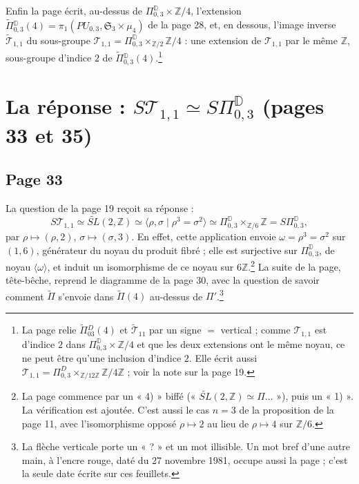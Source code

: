 \documentclass[11pt,a4paper]{article}
\begin{document}
Enfin la page écrit, au-dessus de $\Pi^{\mathbb{D}}_{0,3} \times \mathbb{Z}/4$,
l'extension $\widetilde{\Pi}{}^{\mathbb{D}}_{0,3}(4) = \pi_1(PU_{0,3},
\mathfrak{S}_3 \times \mu_4)$ de la page 28, et, en dessous, l'image inverse
$\widetilde{\mathcal{T}}_{1,1}$ du sous-groupe $\mathcal{T}_{1,1} =
\Pi^{\mathbb{D}}_{0,3} \times_{\mathbb{Z}/2} \mathbb{Z}/4$ : une extension de
$\mathcal{T}_{1,1}$ par le même $\mathbb{Z}$, sous-groupe d'indice $2$ de
$\widetilde{\Pi}{}^{\mathbb{D}}_{0,3}(4)$.\footnote{La page relie
$\widetilde{\Pi}{}^{D}_{03}(4)$ et $\widetilde{\mathcal{T}}_{11}$ par un signe $=$
vertical ; comme $\mathcal{T}_{1,1}$ est d'indice $2$ dans $\Pi^{\mathbb{D}}_{0,3}
\times \mathbb{Z}/4$ et que les deux extensions ont le même noyau, ce ne peut être
qu'une inclusion d'indice $2$. Elle écrit aussi
$\mathcal{T}_{1,1} = \Pi^{D}_{0,3} \times_{\mathbb{Z}/12\mathbb{Z}}
\mathbb{Z}/4\mathbb{Z}$ ; voir la note sur la page 19.}

\section*{La réponse : $S\mathcal{T}_{1,1} \simeq S\Pi^{\mathbb{D}}_{0,3}$ (pages 33 et 35)}

\subsection*{Page 33}

La question de la page 19 reçoit sa réponse :
\[
S\mathcal{T}_{1,1} \simeq \widetilde{SL}(2, \mathbb{Z})
\simeq \langle \rho, \sigma \mid \rho^3 = \sigma^2 \rangle
\simeq \Pi^{\mathbb{D}}_{0,3} \times_{\mathbb{Z}/6} \mathbb{Z}
= S\Pi^{\mathbb{D}}_{0,3} ,
\]
par $\rho \mapsto (\rho, 2)$, $\sigma \mapsto (\sigma, 3)$. En effet, cette
application envoie $\omega = \rho^3 = \sigma^2$ sur $(1, 6)$, générateur du noyau
du produit fibré ; elle est surjective sur $\Pi^{\mathbb{D}}_{0,3}$, de noyau
$\langle \omega \rangle$, et induit un isomorphisme de ce noyau sur
$6\mathbb{Z}$.\footnote{La page commence par un « 4) » biffé
(« $\widetilde{SL}(2, \mathbb{Z}) \simeq \Pi \ldots$ »), puis un « 1) ». La
vérification est ajoutée. C'est aussi le cas $n = 3$ de la proposition de la page
11, avec l'isomorphisme opposé $\rho \mapsto 2$ au lieu de $\rho \mapsto 4$ sur
$\mathbb{Z}/6$.} La suite de la page, tête-bêche, reprend le diagramme de la
page 30, avec la question de savoir comment $\widetilde{\Pi}$ s'envoie dans
$\widetilde{\Pi}(4)$ au-dessus de $\Pi'$.\footnote{La flèche verticale porte un
« ? » et un mot illisible. Un mot bref d'une autre main, à l'encre rouge, daté du
27 novembre 1981, occupe aussi la page ; c'est la seule date écrite sur ces
feuillets.}
\end{document}
